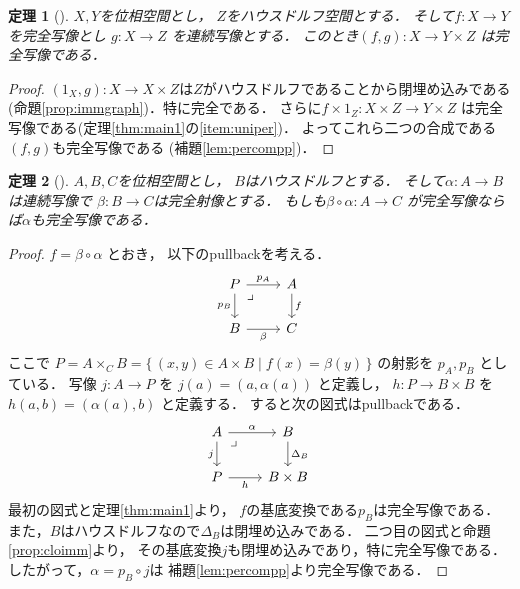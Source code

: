 \documentclass[leqno, a4paper, 12pt, dvipdfmx]{jsarticle}
\newtheorem{thm}{定理}
\begin{document}
\begin{thm}[]\label{thm:mic1}
$X, Y$を位相空間とし，
$Z$をハウスドルフ空間とする．
そして$f\colon X\to Y$を完全写像とし
$g\colon X\to Z$
を連続写像とする．
このとき$(f, g)\colon X\to Y\times Z$
は完全写像である．
\end{thm}
\begin{proof}

$(1_{X}, g)\colon X\to X\times Z$は$Z$がハウスドルフであることから閉埋め込みである(命題\ref{prop:immgraph})．特に完全である．
さらに$f\times 1_{Z}\colon X\times Z\to Y\times Z$
は完全写像である(定理\ref{thm:main1}の\ref{item:uniper})．
よってこれら二つの合成である$(f, g)$も完全写像である
(補題\ref{lem:percompp})．
\end{proof}

\begin{thm}[]\label{thm:mic2}
$A, B,  C$を位相空間とし，
$B$はハウスドルフとする．
そして$\alpha\colon A\to B$は連続写像で
$\beta\colon B\to C$は完全射像とする．
もしも$\beta\circ \alpha\colon A\to C$
が完全写像ならば$\alpha$も完全写像である．
\end{thm}

\begin{proof}
$f=\beta\circ\alpha$ とおき，
以下のpullbackを考える．
\[
\begin{tikzcd}
P \arrow[r,"p_A"] \arrow[d,"p_B"']
  \arrow[dr,phantom,"\lrcorner",very near start]
& A \arrow[d,"f"]\\
B \arrow[r,"\beta"'] & C
\end{tikzcd}
\]
ここで
$P=A\times_C B=
\{\, (x, y)\in A\times B\mid f(x)=\beta(y)\, \}$ 
の射影を $p_A,p_B$ としている．
写像
$j\colon A\to P$
を
$j(a)=(a,\alpha(a))$
と定義し，
$h\colon P\to B\times B$
を$h(a,b)=(\alpha(a),b)$
と定義する．
すると次の図式はpullbackである．
\[
\begin{tikzcd}
A \arrow[r,"\alpha"] \arrow[d,"j"']
  \arrow[dr,phantom,"\lrcorner",very near start]
& B \arrow[d,"\Delta_B"]\\
P \arrow[r,"h"'] & B\times B
\end{tikzcd}
\]
最初の図式と定理\ref{thm:main1}より，
$f$の基底変換である$p_B$は完全写像である．
また，$B$はハウスドルフなので$\Delta_B$は閉埋め込みである．
二つ目の図式と命題\ref{prop:cloimm}より，
その基底変換$j$も閉埋め込みであり，特に完全写像である．
したがって，$\alpha=p_B\circ j$は
補題\ref{lem:percompp}より完全写像である．
\end{proof}
\end{document}
